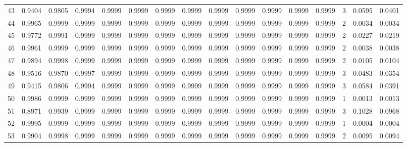 \begin{tabular}{lrrrrrrrrrrrrrrr}
43  &      0.9404 &  0.9805 &  0.9994 &  0.9999 &  0.9999 &  0.9999 &  0.9999 &  0.9999 &  0.9999 &  0.9999 &   0.9999 &     0.9999 &      3 &                    0.0595 &                     0.0401 \\
44  &      0.9965 &  0.9999 &  0.9999 &  0.9999 &  0.9999 &  0.9999 &  0.9999 &  0.9999 &  0.9999 &  0.9999 &   0.9999 &     0.9999 &      2 &                    0.0034 &                     0.0034 \\
45  &      0.9772 &  0.9991 &  0.9999 &  0.9999 &  0.9999 &  0.9999 &  0.9999 &  0.9999 &  0.9999 &  0.9999 &   0.9999 &     0.9999 &      2 &                    0.0227 &                     0.0219 \\
46  &      0.9961 &  0.9999 &  0.9999 &  0.9999 &  0.9999 &  0.9999 &  0.9999 &  0.9999 &  0.9999 &  0.9999 &   0.9999 &     0.9999 &      2 &                    0.0038 &                     0.0038 \\
47  &      0.9894 &  0.9998 &  0.9999 &  0.9999 &  0.9999 &  0.9999 &  0.9999 &  0.9999 &  0.9999 &  0.9999 &   0.9999 &     0.9999 &      2 &                    0.0105 &                     0.0104 \\
48  &      0.9516 &  0.9870 &  0.9997 &  0.9999 &  0.9999 &  0.9999 &  0.9999 &  0.9999 &  0.9999 &  0.9999 &   0.9999 &     0.9999 &      3 &                    0.0483 &                     0.0354 \\
49  &      0.9415 &  0.9806 &  0.9994 &  0.9999 &  0.9999 &  0.9999 &  0.9999 &  0.9999 &  0.9999 &  0.9999 &   0.9999 &     0.9999 &      3 &                    0.0584 &                     0.0391 \\
50  &      0.9986 &  0.9999 &  0.9999 &  0.9999 &  0.9999 &  0.9999 &  0.9999 &  0.9999 &  0.9999 &  0.9999 &   0.9999 &     0.9999 &      1 &                    0.0013 &                     0.0013 \\
51  &      0.8971 &  0.9939 &  0.9999 &  0.9999 &  0.9999 &  0.9999 &  0.9999 &  0.9999 &  0.9999 &  0.9999 &   0.9999 &     0.9999 &      3 &                    0.1028 &                     0.0968 \\
52  &      0.9995 &  0.9999 &  0.9999 &  0.9999 &  0.9999 &  0.9999 &  0.9999 &  0.9999 &  0.9999 &  0.9999 &   0.9999 &     0.9999 &      1 &                    0.0004 &                     0.0004 \\
53  &      0.9904 &  0.9998 &  0.9999 &  0.9999 &  0.9999 &  0.9999 &  0.9999 &  0.9999 &  0.9999 &  0.9999 &   0.9999 &     0.9999 &      2 &                    0.0095 &                     0.0094 \\

\end{tabular}
